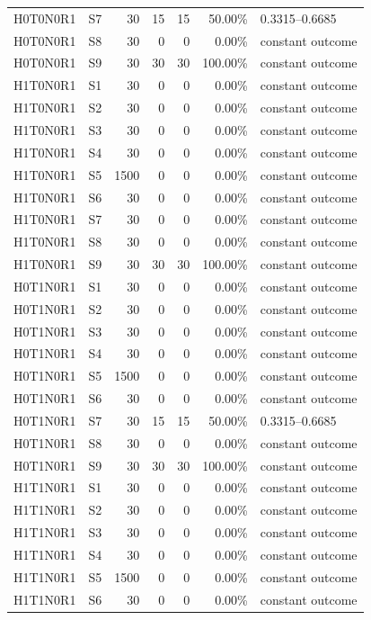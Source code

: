 \begin{tabular}{llrrrrl}
H0T0N0R1 & S7 & 30 & 15 & 15 & 50.00\% & 0.3315--0.6685 \\
H0T0N0R1 & S8 & 30 & 0 & 0 & 0.00\% & constant outcome \\
H0T0N0R1 & S9 & 30 & 30 & 30 & 100.00\% & constant outcome \\
H1T0N0R1 & S1 & 30 & 0 & 0 & 0.00\% & constant outcome \\
H1T0N0R1 & S2 & 30 & 0 & 0 & 0.00\% & constant outcome \\
H1T0N0R1 & S3 & 30 & 0 & 0 & 0.00\% & constant outcome \\
H1T0N0R1 & S4 & 30 & 0 & 0 & 0.00\% & constant outcome \\
H1T0N0R1 & S5 & 1500 & 0 & 0 & 0.00\% & constant outcome \\
H1T0N0R1 & S6 & 30 & 0 & 0 & 0.00\% & constant outcome \\
H1T0N0R1 & S7 & 30 & 0 & 0 & 0.00\% & constant outcome \\
H1T0N0R1 & S8 & 30 & 0 & 0 & 0.00\% & constant outcome \\
H1T0N0R1 & S9 & 30 & 30 & 30 & 100.00\% & constant outcome \\
H0T1N0R1 & S1 & 30 & 0 & 0 & 0.00\% & constant outcome \\
H0T1N0R1 & S2 & 30 & 0 & 0 & 0.00\% & constant outcome \\
H0T1N0R1 & S3 & 30 & 0 & 0 & 0.00\% & constant outcome \\
H0T1N0R1 & S4 & 30 & 0 & 0 & 0.00\% & constant outcome \\
H0T1N0R1 & S5 & 1500 & 0 & 0 & 0.00\% & constant outcome \\
H0T1N0R1 & S6 & 30 & 0 & 0 & 0.00\% & constant outcome \\
H0T1N0R1 & S7 & 30 & 15 & 15 & 50.00\% & 0.3315--0.6685 \\
H0T1N0R1 & S8 & 30 & 0 & 0 & 0.00\% & constant outcome \\
H0T1N0R1 & S9 & 30 & 30 & 30 & 100.00\% & constant outcome \\
H1T1N0R1 & S1 & 30 & 0 & 0 & 0.00\% & constant outcome \\
H1T1N0R1 & S2 & 30 & 0 & 0 & 0.00\% & constant outcome \\
H1T1N0R1 & S3 & 30 & 0 & 0 & 0.00\% & constant outcome \\
H1T1N0R1 & S4 & 30 & 0 & 0 & 0.00\% & constant outcome \\
H1T1N0R1 & S5 & 1500 & 0 & 0 & 0.00\% & constant outcome \\
H1T1N0R1 & S6 & 30 & 0 & 0 & 0.00\% & constant outcome \\

\end{tabular}

